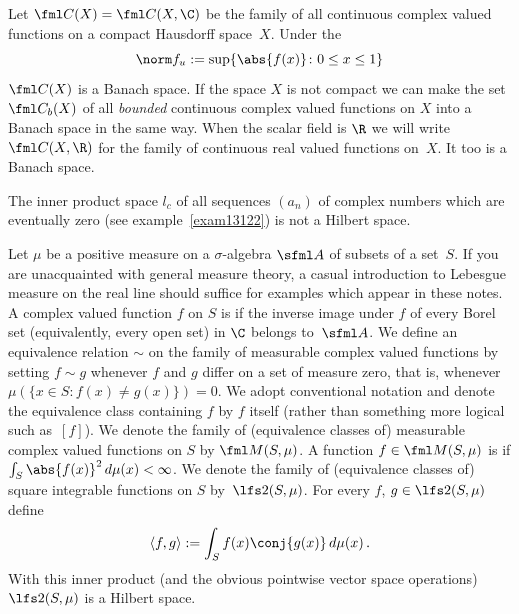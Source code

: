 \begin{exam}\label{exam_CX} Let $\fml C(X) = \fml C(X,\C)$ be the family of all continuous complex valued functions on a compact
Hausdorff space~$X$.  Under the
   \[ \norm f_u := \sup\{\abs{f(x)}\colon 0 \le x \le 1\} \]
$\fml C(X)$ is a Banach space.  If the space $X$ is not compact we can make the set $\fml C_b(X)$
of all \emph{bounded} continuous complex valued functions on $X$ into a Banach space in the same way.
When the scalar field is $\R$ we will
write $\fml C(X,\R)$ for the family of continuous real valued functions on~$X$.  It too is a Banach space.
\end{exam}

\begin{exam}\label{000213} The inner product space $l_c$ of all sequences $(a_n)$ of complex numbers which are eventually zero
(see example~\ref{exam13122}) is not a Hilbert space.
\end{exam}

\begin{exam}\label{00022} Let $\mu$ be a positive measure on a $\sigma$-algebra $\sfml A$ of
subsets of a set~$S$.  If you are unacquainted with general measure theory, a casual introduction to Lebesgue measure
on the real line should suffice for examples which appear in these notes.  A complex valued function $f$ on $S$ is
 if the inverse image under $f$ of every Borel set (equivalently, every open
set) in $\C$ belongs to~$\sfml A$. We define an equivalence relation $\sim$ on the family of
measurable complex valued functions by setting $f \sim g$ whenever $f$ and $g$ differ on a set
of measure zero, that is, whenever $\mu(\{x \in S\colon f(x) \ne g(x)\}) = 0$.  We adopt
conventional notation and denote the equivalence class containing $f$ by $f$ itself (rather
than something more logical such as~$[f]$).  We denote the family of (equivalence classes of)
measurable complex valued functions on $S$ by $\fml M(S,\mu)$. A function $f \in \fml M(S,\mu)$ is
 if $\int_S \abs{f(x)}^2\,d\mu(x) < \infty$.  We denote the family of
(equivalence classes of) square integrable functions on $S$ by~$\lfs 2(S,\mu)$.
For every $f$, $g \in \lfs 2(S,\mu)$ define
   \[ \langle f,g \rangle := \int_S f(x) \conj{g(x)}\,d\mu(x)\,. \]
With this inner product (and the obvious pointwise vector space operations) $\lfs 2(S,\mu)$ is a Hilbert space.
\end{exam}

